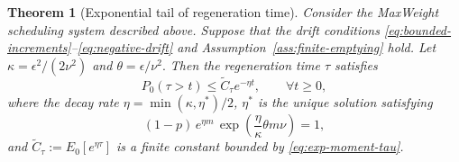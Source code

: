 \documentclass[11pt]{article}
\newtheorem{theorem}{Theorem}
\begin{document}
\begin{theorem}[Exponential tail of regeneration time]
\label{thm:maxweight-tail}
Consider the MaxWeight scheduling system described above.
Suppose that the drift conditions \eqref{eq:bounded-increments}--\eqref{eq:negative-drift} and Assumption~\ref{ass:finite-emptying} hold. Let $\kappa=\epsilon^2/(2\nu^2)$ and $\theta=\epsilon/\nu^2.$
Then the regeneration time $\tau$ satisfies
\[
P_0(\tau > t) \le \tilde{C}_\tau e^{-\eta t}, \qquad \forall t \ge 0,
\]
where the decay rate $\eta =\min(\kappa,\eta^*)/2$, $\eta^*$ is the unique solution satisfying
\[
(1-p)\,e^{\eta m}\,\exp\!\left(\frac{\eta}{\kappa}\theta m\nu\right) = 1,
\]
and $\tilde{C}_\tau := E_0[e^{\eta \tau}]$ is a finite constant bounded by \eqref{eq:exp-moment-tau}.
\end{theorem}
\end{document}
